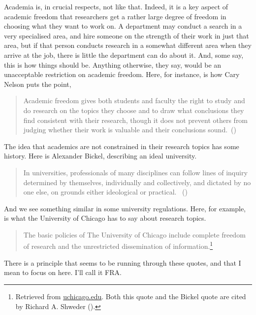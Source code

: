 \documentclass[
  10pt,
  letterpaper,
  DIV=11,
  numbers=noendperiod,
  twoside]{scrartcl}
\begin{document}
Academia is, in crucial respects, not like that. Indeed, it is a key
aspect of academic freedom that researchers get a rather large degree of
freedom in choosing what they want to work on. A department may conduct
a search in a very specialised area, and hire someone on the strength of
their work in just that area, but if that person conducts research in a
somewhat different area when they arrive at the job, there is little the
department can do about it. And, some say, this is how things should be.
Anything otherwise, they say, would be an unacceptable restriction on
academic freedom. Here, for instance, is how Cary Nelson puts the point,

\begin{quote}
Academic freedom gives both students and faculty the right to study and
do research on the topics they choose and to draw what conclusions they
find consistent with their research, though it does not prevent others
from judging whether their work is valuable and their conclusions
sound.~()
\end{quote}

The idea that academics are not constrained in their research topics has
some history. Here is Alexander Bickel, describing an ideal university.

\begin{quote}
In universities, professionals of many disciplines can follow lines of
inquiry determined by themselves, individually and collectively, and
dictated by no one else, on grounds either ideological or practical.
~()
\end{quote}

And we see something similar in some university regulations. Here, for
example, is what the University of Chicago has to say about research
topics.

\begin{quote}
The basic policies of The University of Chicago include complete freedom
of research and the unrestricted dissemination of
information.\footnote{Retrieved from
  \href{https://provost.uchicago.edu/handbook/research/research-policies}{uchicago.edu}.
  Both this quote and the Bickel quote are cited by Richard A. Shweder
  ().}
\end{quote}

There is a principle that seems to be running through these quotes, and
that I mean to focus on here. I'll call it FRA.
\end{document}
